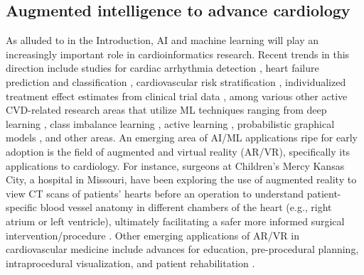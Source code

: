 \documentclass[letter]{bib}
\begin{document}
	
	\subsection*{Augmented intelligence to advance cardiology}
	As alluded to in the Introduction, AI and machine learning will play an increasingly important role in cardioinformatics research.  Recent trends in this direction include studies for cardiac arrhythmia detection \citep{Hannun:2019:Cardiologist,Attia:2019:An}, heart failure prediction and classification \citep{Awan:2018:Machine,Choi:2017:Using,Shah:2015:phenomapping}, cardiovascular risk stratification \citep{Singh:2011:Acomparison}, individualized treatment effect estimates from clinical trial data \citep{Duan:2019:Clinical}, among various other active CVD-related research areas \citep{Johnson:2018:Artificial,Alaref:2018:Clinical,Krittanawong:2017:Artificial,Zeevi:2015:Personalized} that utilize ML techniques ranging from deep learning \citep{Krittanawong:2019:Deep,Bello:2019:Deep,Hannun:2019:Cardiologist,Bizopoulos:2018:Deep,Madani:2018:Deep,Lee:2018:Deep,Kwon:2018:Algorithm,Choi:2017:Using}, class imbalance learning \citep{Liu:2014:Risk,Rahman2013AddressingTC}, active learning \citep{NIPS2010_4091}, probabilistic graphical models \citep{Orphanou:2016:DBN,Gong:2015:Inferring}, and other areas.  An emerging area of AI/ML applications ripe for early adoption is the field of augmented and virtual reality (AR/VR), specifically its applications to cardiology.  For instance, surgeons at Children's Mercy Kansas City, a hospital in Missouri, have been exploring the use of augmented reality to view CT scans of patients' hearts before an operation to understand patient-specific blood vessel anatomy in different chambers of the heart (e.g., right atrium or left ventricle), ultimately facilitating a safer more informed surgical intervention/procedure \citep{Matthews:2018:Virtual}.  Other emerging applications of AR/VR in cardiovascular medicine include advances for education, pre-procedural planning, intraprocedural visualization, and patient rehabilitation \citep{Silva:2018:Emerging}.         
	
\end{document}
